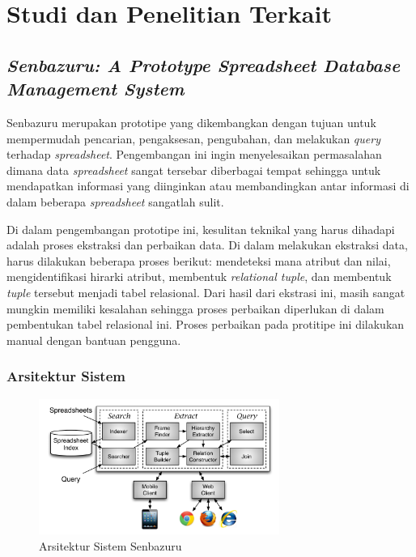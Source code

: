 
\section{Studi dan Penelitian Terkait}
\subsection{\textit{Senbazuru: A Prototype Spreadsheet Database Management System}}
Senbazuru \citep{Chen2013-2} merupakan prototipe yang dikembangkan dengan tujuan untuk mempermudah pencarian, pengaksesan, pengubahan, dan melakukan \textit{query} terhadap \textit{spreadsheet}. Pengembangan ini ingin menyelesaikan permasalahan dimana data \textit{spreadsheet} sangat tersebar diberbagai tempat sehingga untuk mendapatkan informasi yang diinginkan atau membandingkan antar informasi di dalam beberapa \textit{spreadsheet} sangatlah sulit.

Di dalam pengembangan prototipe ini, kesulitan teknikal yang harus dihadapi adalah proses ekstraksi dan perbaikan data. Di dalam melakukan ekstraksi data, harus dilakukan beberapa proses berikut: mendeteksi mana atribut dan nilai, mengidentifikasi hirarki atribut, membentuk \textit{relational tuple}, dan membentuk \textit{tuple} tersebut menjadi tabel relasional. Dari hasil dari ekstrasi ini, masih sangat mungkin memiliki kesalahan sehingga proses perbaikan diperlukan di dalam pembentukan tabel relasional ini. Proses perbaikan pada protitipe ini dilakukan manual dengan bantuan pengguna.

\subsubsection{Arsitektur Sistem}

\begin{figure}[!htb]
    \centering
    \includegraphics[width=0.7\textwidth]{resources/chapter-2-senbazuru-architecture.png}
    \caption{Arsitektur Sistem Senbazuru \citep{Chen2013-2}}
    \label{ArsiSisSenbazuru}
\end{figure}

